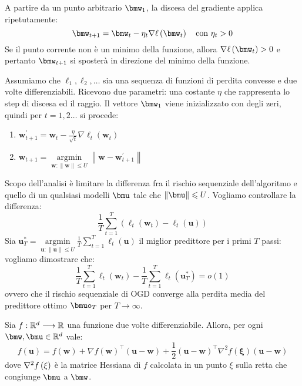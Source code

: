 \documentclass[\main/main.tex]{subfiles}
\begin{document}
\begin{multicols}{2}
\begin{definition}
    A partire da un punto arbitrario \(\bmw_1\), la discesa del gradiente applica ripetutamente:
    \[
        \bmw_{t+1} = \bmw_t - \eta_t\nabla\ell\rnd{\bmw_t} \quad \text{con }\eta_t>0
    \]
    Se il punto corrente non è un minimo della funzione, allora \(\nabla\ell\rnd{\bmw_t} > 0\) e pertanto \(\bmw_{t+1}\) si sposterà in direzione del minimo della funzione.
\end{definition}
\begin{definition}
    Assumiamo che \(\ell_1, \ell_2, \ldots\) sia una sequenza di funzioni di perdita convesse e due volte differenziabili. Ricevono due parametri: una costante \(\eta\) che rappresenta lo step di discesa ed il raggio. Il vettore \(\bmw_1\) viene inizializzato con degli zeri, quindi per \(t=1,2\ldots\) si procede:
    \begin{enumerate}
        \item \(\boldsymbol{w}_{t+1}^{\prime}=\boldsymbol{w}_{t}-\frac{\eta}{\sqrt{t}} \nabla \ell_{t}\left(\boldsymbol{w}_{t}\right)\)
        \item \(\boldsymbol{w}_{t+1}=\underset{\boldsymbol{w} :\|\boldsymbol{w}\| \leq U}{\operatorname{argmin}}\left\|\boldsymbol{w}-\boldsymbol{w}_{t+1}^{\prime}\right\|\)
    \end{enumerate}
\end{definition}
\begin{goal}
    Scopo dell'analisi è limitare la differenza fra il rischio sequenziale dell'algoritmo e quello di un qualsiasi modelli \(\bmu\) tale che \(\norm{\bmu}\leq U\). Vogliamo controllare la differenza:
    \[\frac{1}{T} \sum_{t=1}^{T}\left(\ell_{t}\left(\boldsymbol{w}_{t}\right)-\ell_{t}(\boldsymbol{u})\right)\]
    Sia \(\boldsymbol{u}_{T}^{*}=\underset{\boldsymbol{u} :\|\boldsymbol{u}\| \leq U}{\operatorname{argmin}} \frac{1}{T} \sum_{t=1}^{T} \ell_{t}(\boldsymbol{u})\) il miglior predittore per i primi \(T\) passi: vogliamo dimostrare che:
    \[\frac{1}{T} \sum_{t=1}^{T} \ell_{t}\left(\boldsymbol{w}_{t}\right)-\frac{1}{T} \sum_{t=1}^{T} \ell_{t}\left(\boldsymbol{u}_{T}^{*}\right)=o(1)\]
    ovvero che il rischio sequenziale di OGD converge alla perdita media del predittore ottimo \(\bmuo_T\) per \(T\rightarrow \infty\).
\end{goal}
\begin{lemma}
    Sia \(f:\mathbb{R}^d\longrightarrow \mathbb{R}\) una funzione due volte differenziabile. Allora, per ogni \(\bmw, \bmu \in \R^d\) vale:
    \[f(\boldsymbol{u})=f(\boldsymbol{w})+\nabla f(\boldsymbol{w})^{\top}(\boldsymbol{u}-\boldsymbol{w})+\frac{1}{2}(\boldsymbol{u}-\boldsymbol{w})^{\top} \nabla^{2} f(\boldsymbol{\xi})(\boldsymbol{u}-\boldsymbol{w})\]
    dove \(\nabla^2f\left(\xi\right)\) è la matrice Hessiana di \(f\) calcolata in un punto \(\xi\) sulla retta che congiunge \(\bmu\) a \(\bmw\).
\end{lemma}
\end{multicols}
\end{document}
